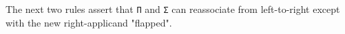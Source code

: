 \documentclass[authoryear, acmsmall, screen, review, nonacm]{acmart} %
\begin{document}
\Ni The next two rules assert that \verb!Π! and \verb!Σ! can reassociate from left-to-right except with the new right-applicand "flapped".
\begin{code} %
%
\>[4]\AgdaSpace{}%
\AgdaSymbol{:}\AgdaSpace{}%
\AgdaSpace{}%
\AgdaSymbol{\{}\AgdaSpace{}%
\AgdaSymbol{:}\AgdaSpace{}%
\AgdaSpace{}%
\AgdaSpace{}%
\AgdaSymbol{(}\AgdaOperator{\AgdaInductiveConstructor{R[}}\AgdaSpace{}%
\AgdaSpace{}%
\AgdaSpace{}%
\AgdaSpace{}%
\AgdaOperator{\AgdaInductiveConstructor{]}}\AgdaSymbol{)\}}\AgdaSpace{}%
\AgdaSymbol{\{}\AgdaSpace{}%
\AgdaSymbol{:}\AgdaSpace{}%
\AgdaSpace{}%
\AgdaSpace{}%
\AgdaSymbol{\}}\AgdaSpace{}%
\AgdaSymbol{\{}\AgdaSpace{}%
\AgdaSymbol{:}\AgdaSpace{}%
\AgdaSpace{}%
\AgdaSymbol{(}\AgdaSpace{}%
\AgdaSymbol{)\}}\AgdaSpace{}%
\<%
\\
\>[4][@{}l@{\AgdaIndent{0}}]%
\>[8]\AgdaSymbol{(}\AgdaSpace{}%
\AgdaSymbol{\{}\AgdaSpace{}%
\AgdaSymbol{=}\AgdaSpace{}%
\AgdaSymbol{\}}\AgdaSpace{}%
\AgdaSpace{}%
\AgdaSymbol{)}\AgdaSpace{}%
\AgdaSpace{}%
\AgdaSpace{}%
\AgdaSpace{}%
\AgdaSpace{}%
\AgdaSymbol{\{}\AgdaSpace{}%
\AgdaSymbol{=}\AgdaSpace{}%
\AgdaSymbol{\}}\AgdaSpace{}%
\AgdaSpace{}%
\AgdaSymbol{(}\AgdaSpace{}%
\AgdaSpace{}%
\AgdaSymbol{)}\<%
\\
%
\>[4]\AgdaSpace{}%
\AgdaSymbol{:}\AgdaSpace{}%
\AgdaSpace{}%
\AgdaSymbol{\{}\AgdaSpace{}%
\AgdaSymbol{:}\AgdaSpace{}%
\AgdaSpace{}%
\AgdaSpace{}%
\AgdaSymbol{(}\AgdaOperator{\AgdaInductiveConstructor{R[}}\AgdaSpace{}%
\AgdaSpace{}%
\AgdaSpace{}%
\AgdaSpace{}%
\AgdaOperator{\AgdaInductiveConstructor{]}}\AgdaSymbol{)\}}\AgdaSpace{}%
\AgdaSymbol{\{}\AgdaSpace{}%
\AgdaSymbol{:}\AgdaSpace{}%

\end{code}
\end{document}
